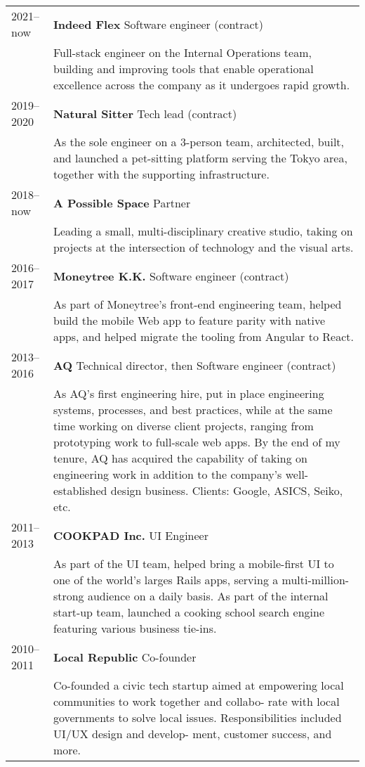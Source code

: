 \documentclass[a4paper,11pt]{article}
\begin{document}
\begin{tabular}{ p{5em} p{34em} }
  2021–now & \textbf{Indeed Flex} Software engineer (contract)\\
  & Full-stack engineer on the Internal Operations team, building and improving tools that enable operational excellence across the company as it undergoes rapid growth.\\

  2019–2020 & \textbf{Natural Sitter} Tech lead (contract)\\
  & As the sole engineer on a 3-person team, architected, built, and launched a pet-sitting platform serving the Tokyo area, together with the supporting infrastructure.\\

  2018–now & \textbf{A Possible Space} Partner\\
  & Leading a small, multi-disciplinary creative studio, taking on projects at the intersection of technology and the visual arts.\\

  2016–2017 & \textbf{Moneytree K.K.} Software engineer (contract)\\
  & As part of Moneytree’s front-end engineering team, helped build the mobile Web app to feature parity with native apps, and helped migrate the tooling from Angular to React.\\

  2013–2016 & \textbf{AQ} Technical director, {\sc then} Software engineer (contract)\\
  & As AQ’s first engineering hire, put in place engineering systems, processes, and best practices, while at the same time working on diverse client projects, ranging from prototyping work to full-scale web apps. By the end of my tenure, AQ has acquired the capability of taking on engineering work in addition to the company’s well-established design business. Clients: Google, ASICS, Seiko, etc.\\

  2011–2013 & \textbf{COOKPAD Inc.} UI Engineer\\
  & As part of the UI team, helped bring a mobile-first UI to one of the world’s larges Rails apps, serving a multi-million-strong audience on a daily basis. As part of the internal start-up team, launched a cooking school search engine featuring various business tie-ins.\\

  2010–2011 & \textbf{Local Republic} Co-founder\\
  & Co-founded a civic tech startup aimed at empowering local communities to work together and collabo- rate with local governments to solve local issues. Responsibilities included UI/UX design and develop- ment, customer success, and more.\\
\end{tabular}
\end{document}
